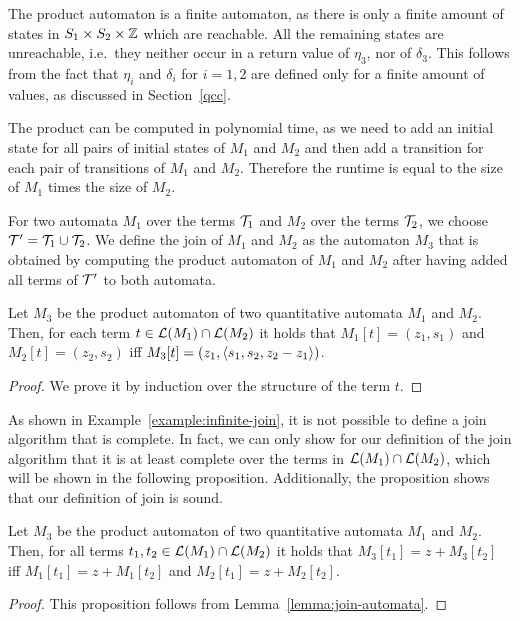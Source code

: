 The product automaton is a finite automaton, as there is only a finite amount of states in $S_1 \times S_2 \times \mathbb{Z}$ which are reachable.
All the remaining states are unreachable, i.e.\ they neither occur in a return value of $\eta_3$, nor of $\delta_3$.
This follows from the fact that $\eta_i$ and $\delta_i$ for $i = 1,2$ are defined only for a finite amount of values, as discussed in Section~\ref{qcc}.

The product can be computed in polynomial time, as we need to add an initial state for all pairs of initial states of $M_1$ and $M_2$ and then add a transition for each pair of transitions of $M_1$ and $M_2$. Therefore the runtime is equal to the size of $M_1$ times the size of $M_2$.

For two automata $M_1$ over the terms $\mathcal{T}_1$ and $M_2$ over the terms $\mathcal{T}_2$, we choose $\mathcal{T}' = \mathcal{T}_1 \cup \mathcal{T}_2$.
We define the join of $M_1$ and $M_2$ as the automaton $M_3$ that is obtained by computing the product automaton of $M_1$ and $M_2$ after having added all terms of $\mathcal{T}'$ to both automata.

\begin{lemma}\label{lemma:join-automata}
    Let $M_3$ be the product automaton of two quantitative automata $M_1$ and $M_2$.
    Then, for each term $t \in \mathcal{L}(M_1) \cap \mathcal{L}(M_2)$ it holds that $M_1[t] = (z_1, s_1)$ and $M_2[t] = (z_2, s_2)$ iff $M_3[t] = (z_1, \langle s_1, s_2, z_2 - z_1\rangle)$.
\end{lemma}
\begin{proof}
    We prove it by induction over the structure of the term $t$.
\end{proof}

As shown in Example~\ref{example:infinite-join}, it is not possible to define a join algorithm that is complete.
In fact, we can only show for our definition of the join algorithm that it is at least complete over the terms in $\mathcal{L}(M_1) \cap \mathcal{L}(M_2)$, which will be shown in the following proposition.
Additionally, the proposition shows that our definition of join is sound.

\begin{proposition}\label{prop:join-automata}
    Let $M_3$ be the product automaton of two quantitative automata $M_1$ and $M_2$.
    Then, for all terms $t_1, t_2 \in \mathcal{L}(M_1) \cap \mathcal{L}(M_2)$ it holds that $M_3[t_1] = z + M_3[t_2]$ iff $M_1[t_1] = z + M_1[t_2]$ and $M_2[t_1] = z + M_2[t_2]$.
\end{proposition}
\begin{proof}
    This proposition follows from Lemma~\ref{lemma:join-automata}.
\end{proof}

